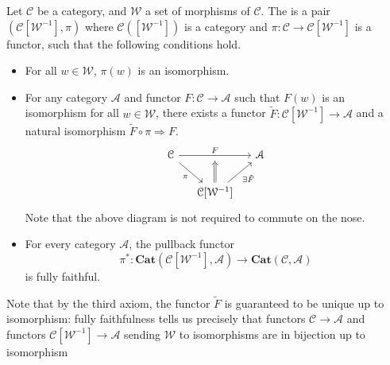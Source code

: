 \documentclass[main.tex]{subfiles}
\begin{document}
\begin{definition}
  \label{def:localization_of_a_category}
  Let $\mathcal{C}$ be a category, and $\mathcal{W}$ a set of morphisms of $\mathcal{C}$. The  is a pair $(\mathcal{C}[\mathcal{W}^{-1}], \pi)$ where $\mathcal{C}([\mathcal{W}^{-1}])$ is a category and $\pi\colon \mathcal{C} \to \mathcal{C}[\mathcal{W}^{-1}]$ is a functor, such that the following conditions hold.

  \begin{itemize}
    \item For all $w \in \mathcal{W}$, $\pi(w)$ is an isomorphism.

    \item For any category $\mathcal{A}$ and functor $F\colon \mathcal{C} \to \mathcal{A}$ such that $F(w)$ is an isomorphism for all $w \in \mathcal{W}$, there exists a functor $\tilde{F}\colon \mathcal{C}[\mathcal{W}^{-1}] \to \mathcal{A}$ and a natural isomorphism $\tilde{F} \circ \pi \Rightarrow F$.
      \begin{equation*}
        \begin{tikzcd}[column sep=small]
          \mathcal{C}
          \arrow[rr, swap, ""'{name=A}, swap, "F"]
          \arrow[dr, swap, "\pi"]
          && \mathcal{A}
          \\
          &\mathcal{C}[\mathcal{W}^{-1}]
          \arrow[ur, swap, "\exists\tilde{F}"]
          \arrow[from=A, Leftarrow]
        \end{tikzcd}
      \end{equation*}
      Note that the above diagram is not required to commute on the nose.

    \item For every category $\mathcal{A}$, the pullback functor
      \begin{equation*}
        \pi^{*}\colon \mathbf{Cat}(\mathcal{C}[\mathcal{W}^{-1}], \mathcal{A}) \to \mathbf{Cat}(\mathcal{C}, \mathcal{A})
      \end{equation*}
      is fully faithful.
  \end{itemize}
\end{definition}

Note that by the third axiom, the functor $\tilde{F}$ is guaranteed to be unique up to isomorphism: fully faithfulness tells us precisely that functors $\mathcal{C} \to \mathcal{A}$ and functors $\mathcal{C}[\mathcal{W}^{-1}] \to \mathcal{A}$ sending $\mathcal{W}$ to isomorphisms are in bijection up to isomorphism
\end{document}
